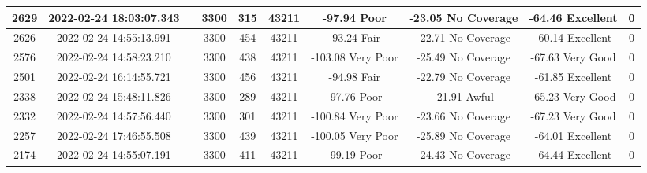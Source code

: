 \begin{longtable*}{|c|c|c|c|c|c|c|c|c|c|}
2629&2022-02-24 18:03:07.343&&3300&315&43211& -97.94    Poor        & -23.05    No Coverage & -64.46    Excellent   & 0\\\hline
{}2626&2022-02-24 14:55:13.991&&3300&454&43211& -93.24    Fair        & -22.71    No Coverage & -60.14    Excellent   & 0\\\hline
{}2576&2022-02-24 14:58:23.210&&3300&438&43211& -103.08   Very Poor   & -25.49    No Coverage & -67.63    Very Good   & 0\\\hline
{}2501&2022-02-24 16:14:55.721&&3300&456&43211& -94.98    Fair        & -22.79    No Coverage & -61.85    Excellent   & 0\\\hline
{}2338&2022-02-24 15:48:11.826&&3300&289&43211& -97.76    Poor        & -21.91    Awful       & -65.23    Very Good   & 0\\\hline
{}2332&2022-02-24 14:57:56.440&&3300&301&43211& -100.84   Very Poor   & -23.66    No Coverage & -67.23    Very Good   & 0\\\hline
{}2257&2022-02-24 17:46:55.508&&3300&439&43211& -100.05   Very Poor   & -25.89    No Coverage & -64.01    Excellent   & 0\\\hline
{}2174&2022-02-24 14:55:07.191&&3300&411&43211& -99.19    Poor        & -24.43    No Coverage & -64.44    Excellent   & 0\\\hline

\end{longtable*}
